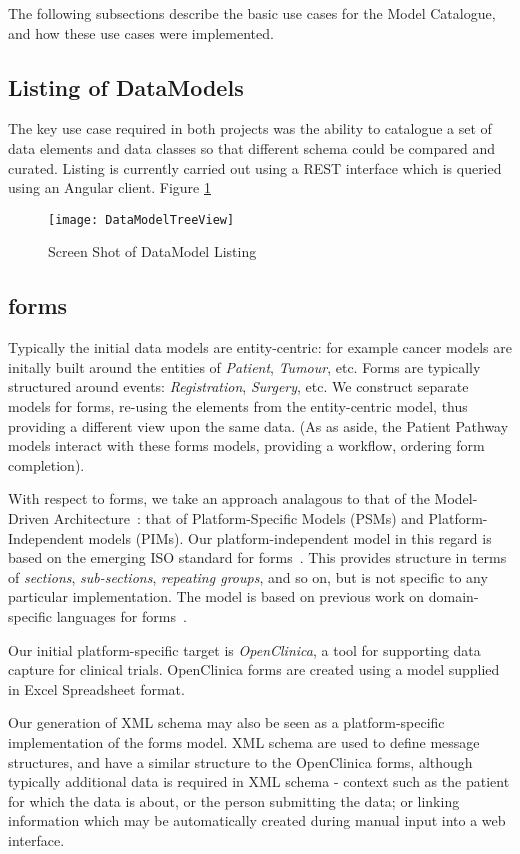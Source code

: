 The following subsections describe the basic use cases for the Model Catalogue, and how these use cases were implemented. 
\subsection{Listing of DataModels}
The key use case required in both projects was the ability to catalogue a set of data elements and data classes so that different schema could be compared and curated. Listing is currently carried out using a REST interface which is queried using an Angular client. Figure \ref{fig:treeviewOfDataModel}
\begin{figure}[here]
	\texttt{[image: DataModelTreeView]}
	\caption{Screen Shot of DataModel Listing} 
	\label{fig:treeviewOfDataModel}	
\end{figure}

\subsection{forms}

Typically the initial data models are entity-centric: for example
cancer models are initally built around the entities of
\emph{Patient}, \emph{Tumour}, etc.  Forms are typically structured around
events: \emph{Registration}, \emph{Surgery}, etc.  We construct
separate models for forms, re-using the elements from the
entity-centric model, thus providing a different view upon the same
data.  (As as aside, the Patient Pathway models interact with these
forms models, providing a workflow, ordering form completion).

With respect to forms, we take an approach analagous to that of the
Model-Driven Architecture~\cite{MDA-proposal}: that of
Platform-Specific Models (PSMs) and Platform-Independent models
(PIMs).  Our platform-independent model in this regard is based on the
emerging ISO standard for forms~\cite{ISOForms}.  This provides
structure in terms of \emph{sections}, \emph{sub-sections},
\emph{repeating groups}, and so on, but is not specific to any
particular implementation.  The model is based on previous work on
domain-specific languages for forms~\cite{Abler2011}.

Our initial platform-specific target is \emph{OpenClinica}, a tool for
supporting data capture for clinical trials.  OpenClinica forms are
created using a model supplied in Excel Spreadsheet format.

Our generation of XML schema may also be seen as a platform-specific
implementation of the forms model.  XML schema are used to define
message structures, and have a similar structure to the OpenClinica
forms, although typically additional data is required in XML schema -
context such as the patient for which the data is about, or the person
submitting the data; or linking information which may be automatically
created during manual input into a web interface. 


